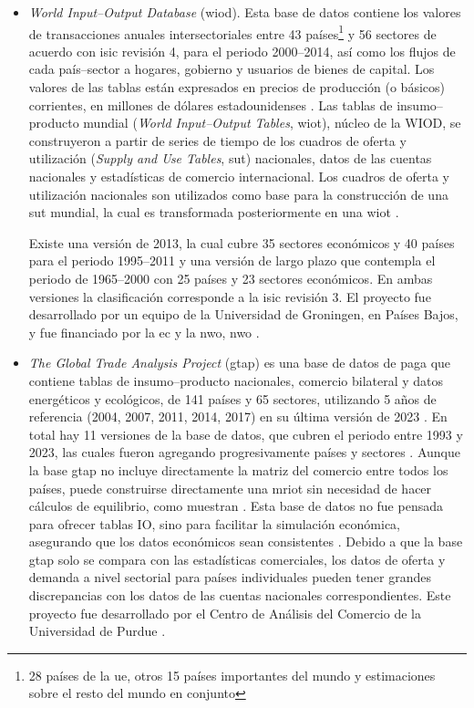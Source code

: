 \begin{itemize}
 \item \textit{World Input--Output Database} (\acrshort{wiod}). Esta base de datos contiene los valores de transacciones anuales intersectoriales entre 43 países\footnote{28 países de la \gls{ue}, otros 15 países importantes del mundo y estimaciones sobre el resto del mundo en conjunto} y 56 sectores de acuerdo con \gls{isic} revisión 4, para el periodo 2000--2014, así como los flujos de cada país--sector a hogares, gobierno y usuarios de bienes de capital. Los valores de las tablas están expresados en precios de producción (o básicos) corrientes, en millones de dólares estadounidenses \parencite{Timmer2015}. %
 Las tablas de insumo--producto mundial (\textit{World Input--Output Tables}, \acrshort{wiot}), núcleo de la WIOD, se construyeron a partir de series de tiempo de los cuadros de oferta y utilización (\textit{Supply and Use Tables}, \acrshort{sut}) nacionales, datos de las cuentas nacionales y estadísticas de comercio internacional. Los cuadros de oferta y utilización nacionales son utilizados como base para la construcción de una \acrshort{sut} mundial, la cual es transformada posteriormente en una \acrshort{wiot} \parencite{Dietzenbacher2013}. 
 
 Existe una versión de 2013, la cual cubre 35 sectores económicos y 40 países para el periodo 1995--2011 y una versión de largo plazo que contempla el periodo de 1965--2000 con 25 países y 23 sectores económicos. En ambas versiones la clasificación corresponde a la \gls{isic} revisión 3. El proyecto fue desarrollado por un equipo de la Universidad de Groningen, en Países Bajos, y fue financiado por la \gls{ec} y la \acrlong{nwo}, \acrshort{nwo} \parencite{WIOD}.
 
 \item \textit{The Global Trade Analysis  Project} (\acrshort{gtap}) es una base de datos de paga que contiene tablas de insumo--producto nacionales, comercio bilateral y datos energéticos y ecológicos, de 141 países y 65 sectores, utilizando 5 años de referencia (2004, 2007, 2011, 2014, 2017) en su última versión de 2023 \parencite{GTAP11}. En total hay 11 versiones de la base de datos, que cubren el periodo entre 1993 y 2023, las cuales fueron agregando progresivamente países y sectores \parencite{GTAP_History}. Aunque la base \acrshort{gtap} no incluye directamente la matriz del comercio entre todos los países, puede construirse directamente una \gls{mriot} sin necesidad de hacer cálculos de equilibrio, como muestran \textcite{Koopman2010, Peters2011, Andrew2013}. Esta base de datos no fue pensada para ofrecer tablas IO, sino para facilitar la simulación económica, asegurando que los datos económicos sean consistentes \parencite{Peters2011, Wiedmann2011}. Debido a que la base \acrshort{gtap} solo se compara con las estadísticas comerciales, los datos de oferta y demanda a nivel sectorial para países individuales pueden tener grandes discrepancias con los datos de las cuentas nacionales correspondientes. Este proyecto fue desarrollado por el Centro de Análisis del Comercio de la Universidad de Purdue \parencite{Jones2014}.
 

\end{itemize}
